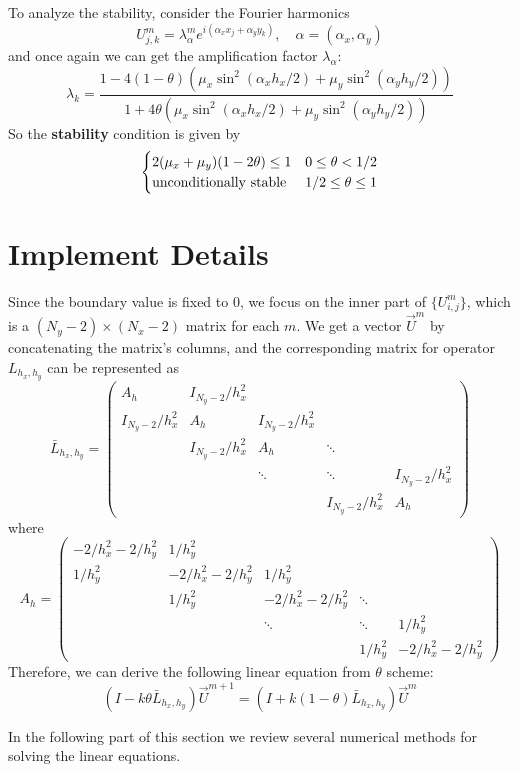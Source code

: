 \documentclass[12pt]{article}
\begin{document}
To analyze the stability, consider the Fourier harmonics 
$$U_{j,k}^m =\lambda_{\alpha}^me^{i(\alpha_xx_j+\alpha_yy_k)},\quad \alpha = (\alpha_x, \alpha_y)$$ and once again we can get the amplification factor $\lambda_\alpha$:
$$
\lambda_k = \frac{1 - 4(1-\theta)\left(\mu_x\sin^2(\alpha_xh_x/2)+\mu_y\sin^2(\alpha_yh_y/2)\right)}{1+4\theta\left(\mu_x\sin^2(\alpha_xh_x/2)+\mu_y\sin^2(\alpha_yh_y/2)\right)}
$$
So the \textbf{stability} condition is given by
$$
\begin{cases}
2(\mu_x+\mu_y)(1-2\theta) \le 1 & 0\le \theta < 1/2\\
\rm{unconditionally\ stable} & 1/2 \le \theta \le 1
\end{cases}
$$
\section{Implement Details}
Since the boundary value is fixed to $0$, we focus on the inner part of $\{U^m_{i,j}\}$, which is a $(N_y - 2)\times(N_x - 2)$ matrix for each $m$. We get a vector $\vec{U}^m$ by concatenating the matrix's columns, and the corresponding matrix for operator $L_{h_x,h_y}$ can be represented as
$$
\bar{L}_{h_x,h_y} = 
\begin{pmatrix}
A_h & I_{N_y-2}/h_x^2\\
I_{N_y-2}/h_x^2 & A_h & I_{N_y-2}/h_x^2 \\
 & I_{N_y-2}/h_x^2 & A_h & \ddots \\
 & & \ddots & \ddots & I_{N_y-2}/h_x^2\\
 & & & I_{N_y-2}/h_x^2 & A_h
\end{pmatrix}
$$
where
$$
A_h = 
\begin{pmatrix}
-2/h_x^2-2/h_y^2 & 1/h_y^2\\
1/h_y^2 & -2/h_x^2-2/h_y^2 & 1/h_y^2 \\
 & 1/h_y^2 & -2/h_x^2-2/h_y^2 & \ddots \\
 & & \ddots & \ddots & 1/h_y^2\\
 & & & 1/h_y^2 & -2/h_x^2-2/h_y^2
\end{pmatrix}
$$
Therefore, we can derive the following linear equation from $\theta$ scheme:
$$
(I - k\theta\bar{L}_{h_x,h_y})\vec{U}^{m+1} = (I + k(1 - \theta)\bar{L}_{h_x,h_y})\vec{U}^m
$$

In the following part of this section we review several numerical methods for solving the linear equations. 
\end{document}
